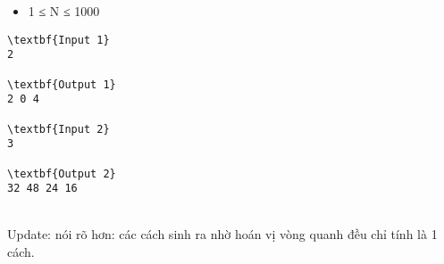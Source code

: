 \begin{itemize}
	\item 1 ≤ N ≤ 1000
\end{itemize}
\begin{verbatim}
\textbf{Input 1}
2

\textbf{Output 1}
2 0 4

\textbf{Input 2}
3

\textbf{Output 2}
32 48 24 16 \end{verbatim}


\\Update: nói rõ hơn: các cách sinh ra nhờ hoán vị vòng quanh đều chỉ tính là 1 cách.